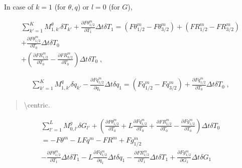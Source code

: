 In case of \(k=1\) (for \(\theta, q\)) or \(l=0\) (for \(G\)),

\begin{eqnarray}
    \sum_{k'=1}^{K}  M^\theta_{1,k'} \delta T_{k'}
  +  \frac{\partial F\theta^{m}_{1/2}}{\partial T_1} \Delta t\delta T_1
        =  (F\theta^{m}_{1/2} - F\theta^{m}_{3/2}) 
        + (FR^{m}_{1/2} - FR^{m}_{3/2})   \\
 +   \frac{\partial F\theta^{m}_{1/2}}{\partial T_0} \Delta t\delta T_0 
      \\
 +  \left(\frac{\partial FR^{m}_{1/2}}{\partial T_0} - \frac{\partial FR^{m}_{3/2}}{\partial T_0} \right)
     \Delta t\delta T_0 \; ,
\end{eqnarray}

\begin{quote}
\protect\hypertarget{comb-theta}{}{}
\end{quote}

\begin{eqnarray}
 \sum_{k'=1}^{K}  M^q_{1,k'} \delta q_{k'}
         - \frac{\partial Fq^{m}_{1/2}}{\partial q_1} \Delta t\delta q_1
         = (Fq^{m}_{1/2} - Fq^{m}_{3/2}) 
         + \frac{\partial Fq^{m}_{1/2}}{\partial T_0} \Delta t\delta T_0 \; ,
\end{eqnarray}

\begin{quote}
\textbackslash centric\centric\centric\centric\centric\centric\centric\centric\centric\centric\centric\centric\centric\centric\centric\centric\centric\centric\centric\centric\centric\centric\centric\centric\centric\centric\centric\centric\centric\centric\fadabraz.
\end{quote}

\begin{eqnarray}
  {\sum_{l'=1}^{L} M^g_{0,l'} \delta G_{l'}
           +  \left(    \frac{\partial F\theta^{m}_{1/2}}{\partial T_0}
           +  L \frac{\partial Fq^{m}_{1/2}}{\partial T_0} 
           +    \frac{\partial FR^{m}_{1/2}}{\partial T_0}
           -  \frac{\partial Fg^{m}_{1/2}}{\partial T_0} \right) \Delta t\delta T_0  }
         \\
         =  - F\theta^{m} - L Fq^{m} - FR^{m} +  Fg^{m}_{1/2}  \\
         -    \frac{\partial F\theta^{m}_{1/2}}{\partial T_1} \Delta t\delta T_1
           -  L \frac{\partial Fq^{m}_{1/2}}{\partial q_1} \Delta t\delta q_1
           -    \frac{\partial FR^{m}_{1/2}}{\partial T_1} \Delta t\delta T_1
           +    \frac{\partial Fg^{m}_{1/2}}{\partial G_1} \Delta t\delta G_1  
\end{eqnarray}


